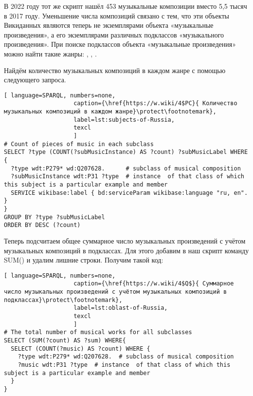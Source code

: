 В 2022 году тот же скрипт нашёл 453 музыкальные композиции вместо 5,5 тысяч в 2017 году. Уменьшение числа композиций связано с тем, что эти объекты Викиданных являются теперь не экземплярами объекта «музыкальные произведения», а его экземплярами различных подклассов «музыкального произведения». При поиске подклассов объекта «музыкальные произведения» можно найти такие жанры: , , .

Найдём количество музыкальных композиций в каждом жанре с помощью следующего запроса.

\begin{lstlisting}[ language=SPARQL, numbers=none,
                    caption={\href{https://w.wiki/4$PC}{ Количество музыкальных композиций в каждом жанре}\protect\footnotemark},
                    label=lst:subjects-of-Russia,
                    texcl 
                    ]
# Count of pieces of music in each subclass
SELECT ?type (COUNT(?subMusicInstance) AS ?count) ?subMusicLabel WHERE {
  ?type wdt:P279* wd:Q207628.      # subclass of musical composition
  ?subMusicInstance wdt:P31 ?type  # instance  of that class of which this subject is a particular example and member
  SERVICE wikibase:label { bd:serviceParam wikibase:language "ru, en". }
}
GROUP BY ?type ?subMusicLabel
ORDER BY DESC (?count)
\end{lstlisting}%


Теперь подсчитаем общее суммарное число музыкальных произведений с учётом музыкальных композиций в подклассах. Для этого добавим в наш скрипт команду SUM() и удалим лишние строки. Получим такой код:

\begin{lstlisting}[ language=SPARQL, numbers=none,
                    caption={\href{https://w.wiki/4$Q$}{ Суммарное число музыкальных произведений с учётом музыкальных композиций в подклассах}\protect\footnotemark},
                    label=lst:oblast-of-Russia,
                    texcl 
                    ]
# The total number of musical works for all subclasses 
SELECT (SUM(?count) AS ?sum) WHERE{
  SELECT (COUNT(?music) AS ?count) WHERE {
    ?type wdt:P279* wd:Q207628.  # subclass of musical composition
    ?music wdt:P31 ?type  # instance  of that class of which this subject is a particular example and member
  }
}
\end{lstlisting}%


